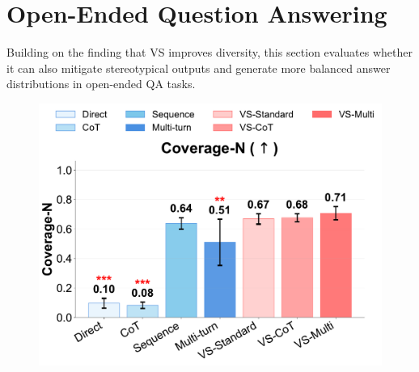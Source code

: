 \section{Open-Ended Question Answering}\label{sec:open-ended_qa}
Building on the finding that VS improves diversity, this section evaluates whether it can also mitigate stereotypical outputs and generate more balanced answer distributions in open-ended QA tasks.


\begin{figure}
    \captionsetup{skip=2pt}
    \centering
    \begin{minipage}{\linewidth}
        \centering
        \includegraphics[width=\linewidth]{figures/bias/coverage_n.pdf}
        \label{fig:bias_coverage_n}
    \end{minipage}

    \vspace{4pt}


\end{figure}

